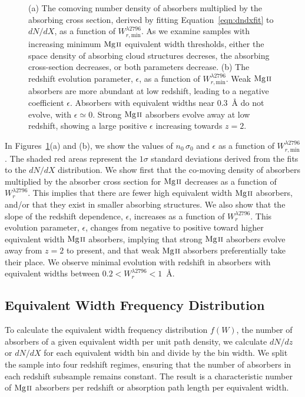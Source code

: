 \documentclass[iop,apj,numberedappendix,appendixfloats,twocolappendix]{emulateapj}
\begin{document}
\begin{figure*}[bth]
\caption{(a) The comoving number density of absorbers multiplied by the absorbing cross section, derived by fitting Equation~\ref{eqn:dndxfit} to $dN\!/dX$, as a function of $W_{r,\mathrm{min}}^{\lambda2796}$. As we examine samples with increasing minimum ${\hbox{{\rm Mg}\kern 0.1em{\sc ii}}}$ equivalent width thresholds, either the space density of absorbing cloud structures decreses, the absorbing cross-section decreases, or both parameters decrease. (b) The redshift evolution parameter, $\epsilon$, as a function of $W_{r,\mathrm{min}}^{\lambda2796}$. Weak ${\hbox{{\rm Mg}\kern 0.1em{\sc ii}}}$ absorbers are more abundant at low redshift, leading to a negative coefficient $\epsilon$. Absorbers with equivalent widths near $0.3$~{\AA} do not evolve, with $\epsilon \simeq 0$. Strong ${\hbox{{\rm Mg}\kern 0.1em{\sc ii}}}$ absorbers evolve away at low redshift, showing a large positive $\epsilon$ increasing towards $z = 2$.}
\label{fig:nsigmaepsilon}
\end{figure*}

In Figures~\ref{fig:nsigmaepsilon}(a) and (b), we show the values of $n_0\,\sigma_0$ and $\epsilon$ as a function of $W_{r,\mathrm{min}}^{\lambda2796}$. The shaded red areas represent the $1\sigma$ standard deviations derived from the fits to the $dN\!/dX$ distribution. We show first that the co-moving density of absorbers multiplied by the absorber cross section for ${\hbox{{\rm Mg}\kern 0.1em{\sc ii}}}$ decreases as a function of $W_r^{\lambda2796}$. This implies that there are fewer high equivalent width ${\hbox{{\rm Mg}\kern 0.1em{\sc ii}}}$ absorbers, and/or that they exist in smaller absorbing structures. We also show that the slope of the redshift dependence, $\epsilon$, increases as a function of $W_r^{\lambda2796}$. This evolution parameter, $\epsilon$, changes from negative to positive toward higher equivalent width ${\hbox{{\rm Mg}\kern 0.1em{\sc ii}}}$ absorbers, implying that strong ${\hbox{{\rm Mg}\kern 0.1em{\sc ii}}}$ absorbers evolve away from $z = 2$ to present, and that weak ${\hbox{{\rm Mg}\kern 0.1em{\sc ii}}}$ absorbers preferentially take their place. We observe minimal evolution with redshift in absorbers with equivalent widths between $0.2 < W_r^{\lambda2796} < 1$~{\AA}.

\subsection{Equivalent Width Frequency Distribution}
\label{sec:ewdistro}

To calculate the equivalent width frequency distribution $f(W)$, the number of absorbers of a given equivalent width per unit path density, we calculate $dN\!/dz$ or $dN\!/dX$ for each equivalent width bin and divide by the bin width. We split the sample into four redshift regimes, ensuring that the number of absorbers in each redshift subsample remains constant. The result is a characteristic number of ${\hbox{{\rm Mg}\kern 0.1em{\sc ii}}}$ absorbers per redshift or absorption path length per equivalent width.
\end{document}
